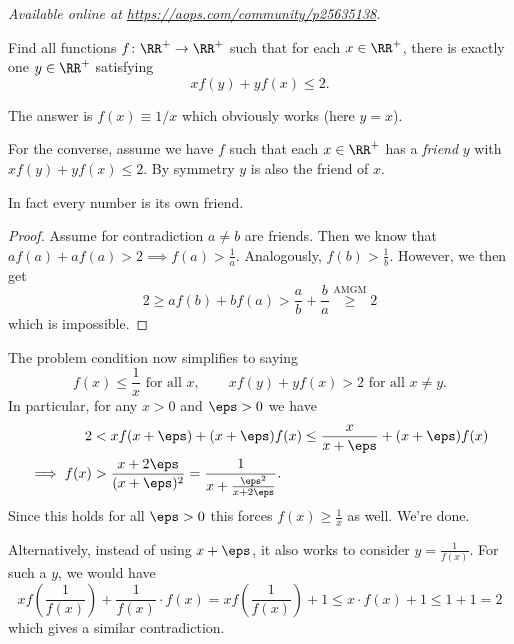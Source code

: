 \textsl{Available online at \url{https://aops.com/community/p25635138}.}
\begin{mdframed}[style=mdpurplebox,frametitle={Problem statement}]
Find all functions $f \colon \RR^+ \to \RR^+$ such that for each $x \in \RR^+$,
there is exactly one $y \in \RR^+$ satisfying \[ xf(y)+yf(x) \leq 2. \]
\end{mdframed}
The answer is $f(x) \equiv 1/x$ which obviously works (here $y=x$).

For the converse, assume we have $f$ such that
each $x \in \RR^+$ has a \emph{friend} $y$ with $xf(y)+yf(x)\le2$.
By symmetry $y$ is also the friend of $x$.

\begin{claim*}
  In fact every number is its own friend.
\end{claim*}
\begin{proof}
  Assume for contradiction $a \neq b$ are friends.
  Then we know that  $af(a) + af(a) > 2 \implies f(a) > \frac 1a$.
  Analogously, $f(b) > \frac 1b$.
  However, we then get
  \[ 2 \ge a f(b) + b f(a) > \frac ab + \frac ba \overset{\text{AMGM}}{\ge} 2 \]
  which is impossible.
\end{proof}

The problem condition now simplifies to saying
\[ f(x) \le \frac1x \text{ for all $x$}, \qquad
  xf(y) + yf(x) > 2 \text{ for all $x \neq y$}. \]
In particular, for any $x>0$ and $\eps > 0$ we have
\begin{align*}
  2 &< xf(x+\eps) + (x+\eps)f(x) \le \frac{x}{x+\eps} + (x+\eps) f(x) \\
  \implies f(x) &> \frac{x+2\eps}{(x+\eps)^2}
  = \frac{1}{x + \frac{\eps^2}{x+2\eps}}.
\end{align*}
Since this holds for all $\eps > 0$ this forces $f(x) \ge \frac1x$ as well.
We're done.

\begin{remark*}
  Alternatively, instead of using $x+\eps$,
  it also works to consider $y = \frac{1}{f(x)}$.
  For such a $y$, we would have
  \[ xf\left( \frac{1}{f(x)} \right) + \frac{1}{f(x)} \cdot f(x)
    = xf\left( \frac{1}{f(x)} \right) + 1
    \leq x \cdot f(x) + 1 \leq 1 + 1 = 2 \]
  which gives a similar contradiction.
\end{remark*}
\pagebreak